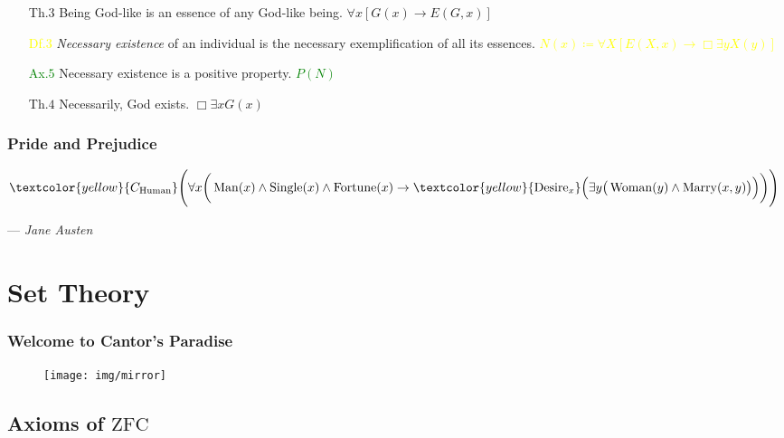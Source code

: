 \documentclass[UTF8,11pt,colorlinks,compress,openany]{beamer}%
\begin{document}
\begin{frame}
{\begin{minipage}{14.1cm}
\begin{itemize}
				\item[Th.$3$] Being God-like is an essence of any God-like being. ${\forall x[G(x)\to E(G,x)]}$
				\item[\textcolor{yellow}{Df.$3$}] \emph{Necessary existence} of an individual is the necessary exemplification of all its essences. \hfill \textcolor{yellow}{${N(x)\coloneqq \forall X[E(X,x) \to\Box\exists y X(y)]}$}
				\item[\textcolor{green}{Ax.$5$}] Necessary existence is a positive property. \hfill \textcolor{green}{${P(N)}$}
				\item[Th.$4$] Necessarily, God exists. \hfill ${\Box\exists x G(x)}$
			\end{itemize}
\end{minipage}}
\end{frame}

\begin{frame}\frametitle{Pride and Prejudice}
$\textcolor{yellow}{C_{\operatorname{Human}}}\Bigg(\forall x\bigg(\operatorname{Man}(x)\wedge \operatorname{Single}(x)\wedge \operatorname{Fortune}(x) \to \textcolor{yellow}{\operatorname{Desire}_x}\Big(\exists y\big(\operatorname{Woman}(y)\wedge \operatorname{Marry}(x,y)\big)\Big)\bigg)\Bigg)$\par\hfill --- \textsl{Jane Austen}
\end{frame}


\section{Set Theory}


\begin{frame}\frametitle{Welcome to Cantor's Paradise}
\begin{figure}[H]
	\texttt{[image: img/mirror]}
\end{figure}
\end{frame}

\subsection{Axioms of $\mathrm{ZFC}$}
\end{document}
